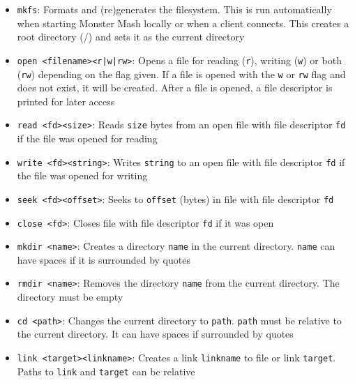 \documentclass[]{article}
\begin{document}
\begin{itemize}
	\item \texttt{mkfs}: Formats and (re)generates the filesystem. This is run automatically when starting Monster Mash locally or when a client connects. This creates a root directory (/) and sets it as the current directory
	
	\item \texttt{open \textless filename\textgreater \space \textless r|w|rw\textgreater}: Opens a file for reading (\texttt{r}), writing (\texttt{w}) or both (\texttt{rw}) depending on the flag given. If a file is opened with the \texttt{w} or \texttt{rw} flag and does not exist, it will be created. After a file is opened, a file descriptor is printed for later access
	
	\item \texttt{read \textless fd\textgreater \space \textless size\textgreater}: Reads \texttt{size} bytes from an open file with file descriptor \texttt{fd} if the file was opened for reading
	
	\item \texttt{write \textless fd\textgreater \space \textless string\textgreater}: Writes \texttt{string} to an open file with file descriptor \texttt{fd} if the file was opened for writing
	
	\item \texttt{seek \textless fd\textgreater \space \textless offset\textgreater}: Seeks to \texttt{offset} (bytes) in file with file descriptor \texttt{fd}
	
	\item \texttt{close \textless fd\textgreater}: Closes file with file descriptor \texttt{fd} if it was open
	
	\item \texttt{mkdir \textless name\textgreater}: Creates a directory \texttt{name} in the current directory. \texttt{name} can have spaces if it is surrounded by quotes
	
	\item \texttt{rmdir \textless name\textgreater}: Removes the directory \texttt{name} from the current directory. The directory must be empty
	
	\item \texttt{cd \textless path\textgreater}: Changes the current directory to \texttt{path}. \texttt{path} must be relative to the current directory. It can have spaces if surrounded by quotes
	
	\item \texttt{link \textless target\textgreater \space \textless linkname\textgreater}: Creates a link \texttt{linkname} to file or link \texttt{target}. Paths to \texttt{link} and \texttt{target} can be relative
	

\end{itemize}
\end{document}
